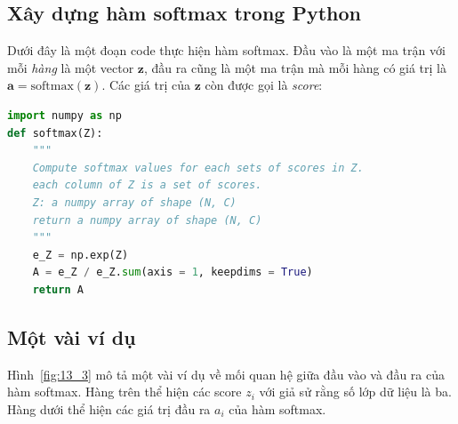 



\subsection{Xây dựng hàm softmax trong Python }
Dưới đây là một đoạn code thực hiện hàm softmax. Đầu vào là một ma trận với mỗi
\textit{hàng} là một vector $\mathbf{z}$, đầu ra cũng là một ma trận mà mỗi hàng có
giá
trị là $\mathbf{a} = \text{softmax}(\mathbf{z})$. Các giá trị của $\mathbf{z}$ còn được gọi là \textit{score}:

\begin{lstlisting}[language=Python]
import numpy as np
def softmax(Z):
    """
    Compute softmax values for each sets of scores in Z.
    each column of Z is a set of scores.
    Z: a numpy array of shape (N, C)
    return a numpy array of shape (N, C)
    """
    e_Z = np.exp(Z)
    A = e_Z / e_Z.sum(axis = 1, keepdims = True)
    return A
\end{lstlisting}


\subsection{Một vài ví dụ }

Hình~\ref{fig:13_3} mô tả một vài ví dụ về mối quan hệ giữa đầu vào và đầu ra
của hàm softmax. Hàng trên thể hiện các score $z_i$ với giả sử rằng số lớp dữ
liệu là ba. Hàng dưới thể hiện các giá trị đầu ra $a_i$ của hàm softmax.


